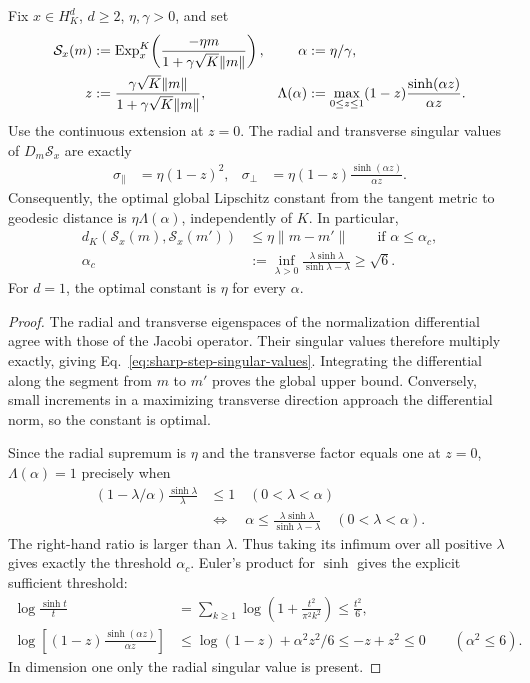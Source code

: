 \begin{theorem}
\label{thm:sharp-normalized-exp}
Fix $x\in H_K^d$, $d\ge2$, $\eta,\gamma>0$, and set
\begin{align}
 \mathcal S_x(m)&:=\operatorname{Exp}_x^K\!\left(\frac{-\eta m}{1+\gamma\sqrt K\|m\|}\right),&
 \alpha&:=\eta/\gamma,\\
 z&:=\frac{\gamma\sqrt K\|m\|}{1+\gamma\sqrt K\|m\|},&
 \Lambda(\alpha)&:=\max_{0\le z\le1}(1-z)\frac{\sinh(\alpha z)}{\alpha z}.
\end{align}
Use the continuous extension at $z=0$. The radial and transverse singular values of $D_m\mathcal S_x$ are exactly
\begin{align}\label{eq:sharp-step-singular-values}
 \sigma_\parallel&=\eta(1-z)^2,&
 \sigma_\perp&=\eta(1-z)\frac{\sinh(\alpha z)}{\alpha z}.
\end{align}
Consequently, the optimal global Lipschitz constant from the tangent metric to geodesic distance is $\eta\Lambda(\alpha)$, independently of $K$. In particular,
\begin{align}
 d_K(\mathcal S_x(m),\mathcal S_x(m'))
 &\le\eta\|m-m'\|\qquad\text{if }\alpha\le\alpha_c,\label{eq:sharp-step-lipschitz}\\
 \alpha_c&:=\inf_{\lambda>0}
 \frac{\lambda\sinh\lambda}{\sinh\lambda-\lambda}
 \ge\sqrt6.
\end{align}
For $d=1$, the optimal constant is $\eta$ for every $\alpha$.
\end{theorem}
\begin{proof}
The radial and transverse eigenspaces of the normalization differential agree with those of the Jacobi operator. Their singular values therefore multiply exactly, giving Eq.~\eqref{eq:sharp-step-singular-values}. Integrating the differential along the segment from $m$ to $m'$ proves the global upper bound. Conversely, small increments in a maximizing transverse direction approach the differential norm, so the constant is optimal.

Since the radial supremum is $\eta$ and the transverse factor equals one at $z=0$, $\Lambda(\alpha)=1$ precisely when
\begin{align}
 (1-\lambda/\alpha)\frac{\sinh\lambda}{\lambda}&\le1
 \quad(0<\lambda<\alpha)\\
 &\Longleftrightarrow\quad
 \alpha\le\frac{\lambda\sinh\lambda}{\sinh\lambda-\lambda}
 \quad(0<\lambda<\alpha).
\end{align}
The right-hand ratio is larger than $\lambda$. Thus taking its infimum over all positive $\lambda$ gives exactly the threshold $\alpha_c$.
Euler's product for $\sinh$ \citep[Eq.~4.36.1]{nistDLMF} gives the explicit sufficient threshold:
\begin{align}
 \log\frac{\sinh t}{t}
 &=\sum_{k\ge1}\log\left(1+\frac{t^2}{\pi^2k^2}\right)
 \le\frac{t^2}{6},\\
 \log\left[(1-z)\frac{\sinh(\alpha z)}{\alpha z}\right]
 &\le\log(1-z)+\alpha^2z^2/6
 \le-z+z^2\le0\qquad(\alpha^2\le6).
\end{align}
In dimension one only the radial singular value is present.
\end{proof}

